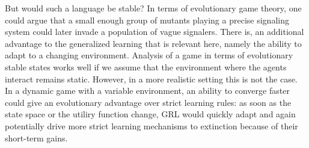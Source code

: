 \documentclass[a4paper]{article}
\begin{document}
But would such a language be stable?
In terms of evolutionary game theory, one could argue that a small enough group of mutants playing a precise signaling system could later invade a population of vague signalers.
There is, an additional advantage to the generalized learning that is relevant here, namely the ability to adapt to a changing environment.
Analysis of a game in terms of evolutionary stable states works well if we assume that the environment where the agents interact remains static.
However, in a more realistic setting this is not the case.
In a dynamic game with a variable environment, an ability to converge faster could give an evolutionary advantage over strict learning rules: as soon as the state space or the utiliry function change, GRL would quickly adapt and again potentially drive more strict learning mechanisms to extinction because of their short-term gains.


\end{document}

